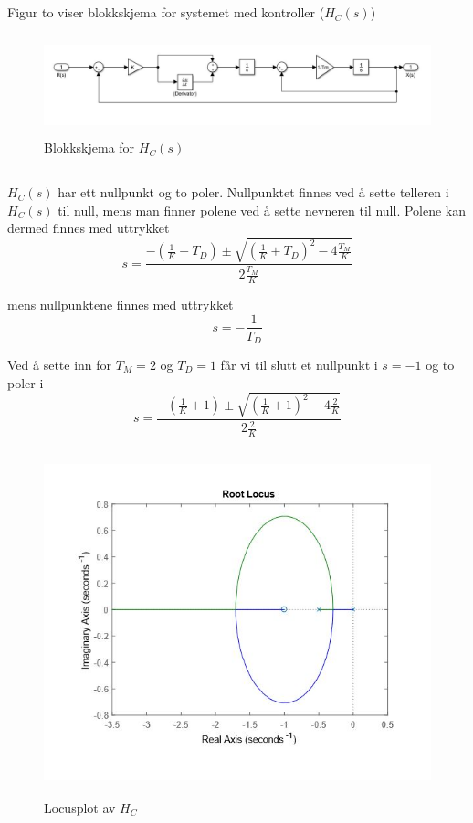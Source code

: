 \documentclass[norsk]{article}
\begin{document}
\subsection{ }
Figur to viser blokkskjema for systemet med kontroller (\(H_C(s)\))
\begin{figure}[!htb]
\includegraphics[height=2.9cm]{illustrations/oppg1d_illu}
\caption{Blokkskjema for \(H_C(s)\)}
\end{figure}

\subsection{ }
\(H_C(s)\) har ett nullpunkt og to poler. Nullpunktet finnes ved å sette telleren i \(H_C(s)\) til null, mens man finner polene ved å sette nevneren til null. Polene kan dermed finnes med uttrykket
\[s = \frac{-(\frac{1}{K} + T_D) \pm \sqrt{(\frac{1}{K} + T_D)^2 - 4\frac{T_M}{K}}}{2\frac{T_M}{K}}\]

mens nullpunktene finnes med uttrykket
\[s = -\frac{1}{T_D}\]

Ved å sette inn for \(T_M = 2\) og \(T_D = 1\) får vi til slutt et nullpunkt i \(s = -1\) og to poler i
\[s = \frac{-(\frac{1}{K} + 1) \pm \sqrt{(\frac{1}{K} + 1)^2 - 4\frac{2}{K}}}{2\frac{2}{K}}\]

\begin{figure}[!htb]
\includegraphics[height=10cm]{illustrations/oppg1e_illu}
\caption{Locusplot av \(H_C\)}
\end{figure}
\end{document}
